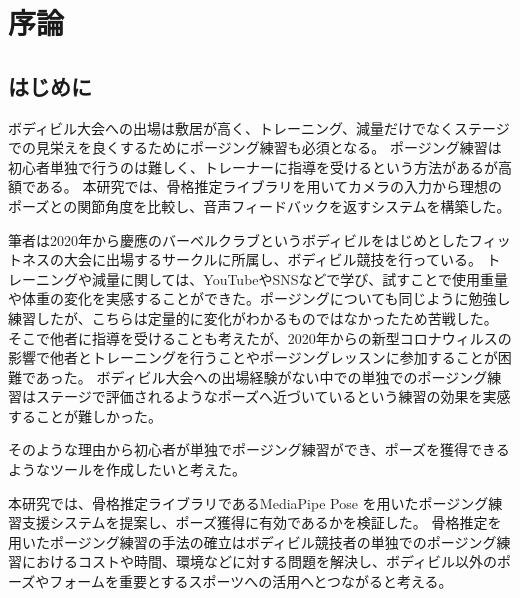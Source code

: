 \chapter{序論}
\label{introduction}

\section{はじめに}
\label{introduction:background}
ボディビル大会への出場は敷居が高く、トレーニング、減量だけでなくステージでの見栄えを良くするためにポージング練習も必須となる。
ポージング練習は初心者単独で行うのは難しく、トレーナーに指導を受けるという方法があるが高額である。
本研究では、骨格推定ライブラリを用いてカメラの入力から理想のポーズとの関節角度を比較し、音声フィードバックを返すシステムを構築した。

筆者は2020年から慶應のバーベルクラブというボディビルをはじめとしたフィットネスの大会に出場するサークルに所属し、ボディビル競技を行っている。
トレーニングや減量に関しては、YouTubeやSNSなどで学び、試すことで使用重量や体重の変化を実感することができた。ポージングについても同じように勉強し練習したが、こちらは定量的に変化がわかるものではなかったため苦戦した。
そこで他者に指導を受けることも考えたが、2020年からの新型コロナウィルスの影響で他者とトレーニングを行うことやポージングレッスンに参加することが困難であった。
ボディビル大会への出場経験がない中での単独でのポージング練習はステージで評価されるようなポーズへ近づいているという練習の効果を実感することが難しかった。

そのような理由から初心者が単独でポージング練習ができ、ポーズを獲得できるようなツールを作成したいと考えた。


本研究では、骨格推定ライブラリであるMediaPipe Pose \cite{mediapipe_pose_landmarker}を用いたポージング練習支援システムを提案し、ポーズ獲得に有効であるかを検証した。
骨格推定を用いたポージング練習の手法の確立はボディビル競技者の単独でのポージング練習におけるコストや時間、環境などに対する問題を解決し、ボディビル以外のポーズやフォームを重要とするスポーツへの活用へとつながると考える。


